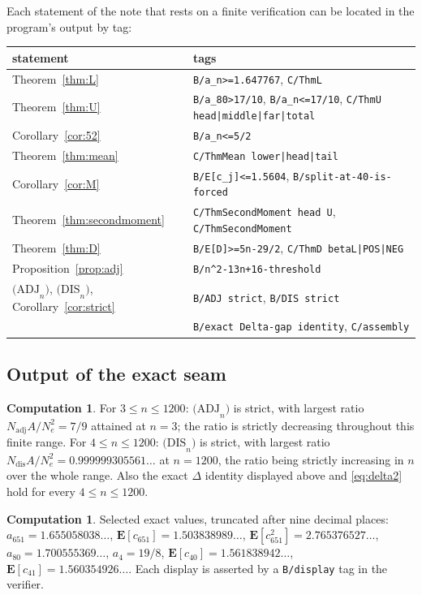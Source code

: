 \documentclass[11pt,a4paper]{amsart}
\theoremstyle{plain}
\theoremstyle{definition}
\newtheorem{computation}[theorem]{Computation}
\newcommand{\EX}{\mathbf{E}}
\newcommand{\Nc}{N}
\newcommand{\ADJ}{\mathrm{(ADJ}_n\mathrm{)}}
\newcommand{\DIS}{\mathrm{(DIS}_n\mathrm{)}}
\begin{document}
Each statement of the note that rests on a finite verification can be located in
the program's output by tag:

\begin{center}\footnotesize
\begin{tabular}{ll}
\hline
statement & tags\\
\hline
Theorem~\ref{thm:L} & \texttt{B/a\_n>=1.647767}, \texttt{C/ThmL}\\
Theorem~\ref{thm:U} & \texttt{B/a\_80>17/10}, \texttt{B/a\_n<=17/10},
  \texttt{C/ThmU head|middle|far|total}\\
Corollary~\ref{cor:52} & \texttt{B/a\_n<=5/2}\\
Theorem~\ref{thm:mean} & \texttt{C/ThmMean lower|head|tail}\\
Corollary~\ref{cor:M} & \texttt{B/E[c\_j]<=1.5604}, \texttt{B/split-at-40-is-forced}\\
Theorem~\ref{thm:secondmoment} & \texttt{C/ThmSecondMoment head U},
  \texttt{C/ThmSecondMoment}\\
Theorem~\ref{thm:D} & \texttt{B/E[D]>=5n-29/2}, \texttt{C/ThmD betaL|POS|NEG}\\
Proposition~\ref{prop:adj} & \texttt{B/n\textasciicircum 2-13n+16-threshold}\\
$\ADJ$, $\DIS$, Corollary~\ref{cor:strict} & \texttt{B/ADJ strict},
  \texttt{B/DIS strict}\\
& \texttt{B/exact Delta-gap identity}, \texttt{C/assembly}\\
\hline
\end{tabular}
\end{center}

\subsection{Output of the exact seam}

\begin{computation}\label{comp:seam}
For $3 \le n \le 1200$: $\ADJ$ is strict, with largest ratio
$\Nc_{\mathrm{adj}}A/\Nc_e^2 = 7/9$ attained at $n=3$; the ratio is strictly
decreasing throughout this finite range. For $4 \le n \le 1200$: $\DIS$ is strict, with largest ratio
$\Nc_{\mathrm{dis}}A/\Nc_e^2 = 0.999999305561\ldots$ at $n=1200$, the ratio being
strictly increasing in $n$ over the whole range. Also the exact $\Delta$
identity displayed above and \eqref{eq:delta2} hold for every
$4 \le n \le 1200$.
\end{computation}

\begin{computation}\label{comp:vals}
Selected exact values, truncated after nine decimal places:
$a_{651} = 1.655058038\ldots$, $\EX[c_{651}] = 1.503838989\ldots$,
$\EX[c^2_{651}] = 2.765376527\ldots$, $a_{80} = 1.700555369\ldots$,
$a_4 = 19/8$, $\EX[c_{40}] = 1.561838942\ldots$,
$\EX[c_{41}] = 1.560354926\ldots$.
Each display is asserted by a \texttt{B/display} tag in the verifier.
\end{computation}
\end{document}
